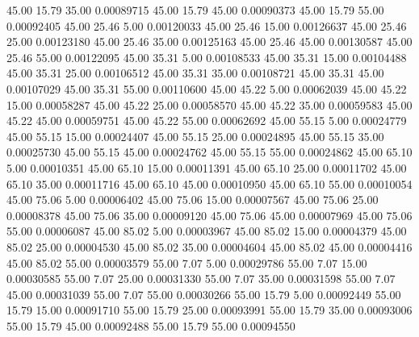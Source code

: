      45.00     15.79     35.00     0.00089715
     45.00     15.79     45.00     0.00090373
     45.00     15.79     55.00     0.00092405
     45.00     25.46      5.00     0.00120033
     45.00     25.46     15.00     0.00126637
     45.00     25.46     25.00     0.00123180
     45.00     25.46     35.00     0.00125163
     45.00     25.46     45.00     0.00130587
     45.00     25.46     55.00     0.00122095
     45.00     35.31      5.00     0.00108533
     45.00     35.31     15.00     0.00104488
     45.00     35.31     25.00     0.00106512
     45.00     35.31     35.00     0.00108721
     45.00     35.31     45.00     0.00107029
     45.00     35.31     55.00     0.00110600
     45.00     45.22      5.00     0.00062039
     45.00     45.22     15.00     0.00058287
     45.00     45.22     25.00     0.00058570
     45.00     45.22     35.00     0.00059583
     45.00     45.22     45.00     0.00059751
     45.00     45.22     55.00     0.00062692
     45.00     55.15      5.00     0.00024779
     45.00     55.15     15.00     0.00024407
     45.00     55.15     25.00     0.00024895
     45.00     55.15     35.00     0.00025730
     45.00     55.15     45.00     0.00024762
     45.00     55.15     55.00     0.00024862
     45.00     65.10      5.00     0.00010351
     45.00     65.10     15.00     0.00011391
     45.00     65.10     25.00     0.00011702
     45.00     65.10     35.00     0.00011716
     45.00     65.10     45.00     0.00010950
     45.00     65.10     55.00     0.00010054
     45.00     75.06      5.00     0.00006402
     45.00     75.06     15.00     0.00007567
     45.00     75.06     25.00     0.00008378
     45.00     75.06     35.00     0.00009120
     45.00     75.06     45.00     0.00007969
     45.00     75.06     55.00     0.00006087
     45.00     85.02      5.00     0.00003967
     45.00     85.02     15.00     0.00004379
     45.00     85.02     25.00     0.00004530
     45.00     85.02     35.00     0.00004604
     45.00     85.02     45.00     0.00004416
     45.00     85.02     55.00     0.00003579
     55.00      7.07      5.00     0.00029786
     55.00      7.07     15.00     0.00030585
     55.00      7.07     25.00     0.00031330
     55.00      7.07     35.00     0.00031598
     55.00      7.07     45.00     0.00031039
     55.00      7.07     55.00     0.00030266
     55.00     15.79      5.00     0.00092449
     55.00     15.79     15.00     0.00091710
     55.00     15.79     25.00     0.00093991
     55.00     15.79     35.00     0.00093006
     55.00     15.79     45.00     0.00092488
     55.00     15.79     55.00     0.00094550

